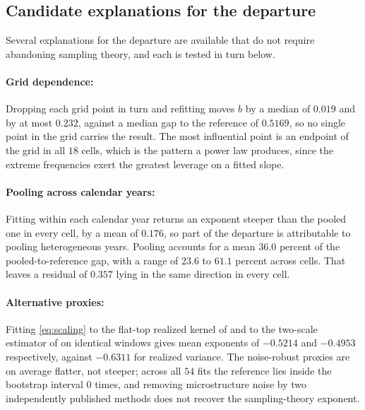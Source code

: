 \subsection{Candidate explanations for the departure}

Several explanations for the departure are available that do not require
abandoning sampling theory, and each is tested in turn below.

\paragraph{Grid dependence:} Dropping each grid point in turn and refitting
moves $b$ by a median of $0.019$ and by at most $0.232$, against a median gap to %
the reference of $0.5169$, so no single point in the grid carries the result. The
most influential point is an endpoint of the grid in all $18$ cells, which is the %
pattern a power law produces, since the extreme frequencies exert the greatest
leverage on a fitted slope.

\paragraph{Pooling across calendar years:} Fitting within each calendar year returns an
exponent steeper than the pooled one in every cell, by a mean of $0.176$, so part %
of the departure is attributable to pooling heterogeneous years. Pooling accounts
for a mean $36.0$ percent of the pooled-to-reference gap, with a range of $23.6$ %
to $61.1$ percent across cells. That leaves a residual of $0.357$ lying in the %
same direction in every cell.

\paragraph{Alternative proxies:} Fitting \eqref{eq:scaling}
to the flat-top realized kernel of \citet{bnhls2008} and to the two-scale
estimator of \citet{zma2005} on identical windows gives mean exponents of
$-0.5214$ and $-0.4953$ respectively, against $-0.6311$ for realized variance. %
The noise-robust proxies are on average flatter, not steeper; across all $54$ %
fits the reference lies inside the bootstrap interval $0$ times, and removing %
microstructure noise by two independently published methods does not recover the
sampling-theory exponent.

